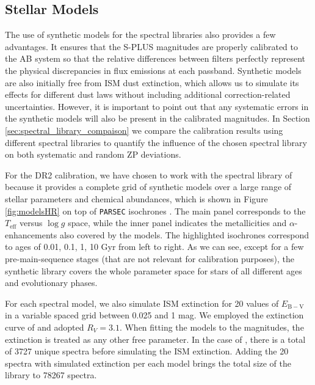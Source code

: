 \documentclass[fleqn,usenatbib]{mnras}
\begin{document}
\subsection{Stellar Models}
\label{sec:models}

The use of synthetic models for the spectral libraries also provides a few advantages. It ensures that the S-PLUS magnitudes are properly calibrated to the AB system so that the relative differences between filters perfectly represent the physical discrepancies in flux emissions at each passband. Synthetic models are also initially free from ISM dust extinction, which allows us to simulate its effects for different dust laws without including additional correction-related uncertainties. However, it is important to point out that any systematic errors in the synthetic models will also be present in the calibrated magnitudes. In Section \ref{sec:spectral_library_compaison} we compare the calibration results using different spectral libraries to quantify the influence of the chosen spectral library on both systematic and random ZP deviations.

For the DR2 calibration, we have chosen to work with the spectral library of  because it provides a complete grid of synthetic models over a large range of stellar parameters and chemical abundances, which is shown in Figure \ref{fig:modelsHR} on top of \texttt{PARSEC} isochrones \citep{Bressan+2012, Marigo+2017}. The main panel corresponds to the $T_\mathrm{eff}$ versus $\log g$ space, while the inner panel indicates the metallicities and $\alpha$-enhancements also covered by the models. The highlighted isochrones correspond to ages of 0.01, 0.1, 1, 10 Gyr from left to right. As we can see, except for a few pre-main-sequence stages (that are not relevant for calibration purposes), the synthetic library covers the whole parameter space for stars of all different ages and evolutionary phases. 

For each spectral model, we also simulate ISM extinction for 20 values of $E_\mathrm{B-V}$ in a variable spaced grid between 0.025 and 1 mag. We employed the extinction curve of \citet{Cardelli+1989} and adopted $R_V = 3.1$. When fitting the models to the magnitudes, the extinction is treated as any other free parameter. In the case of , there is a total of 3727 unique spectra before simulating the ISM extinction. Adding the 20 spectra with simulated extinction per each model brings the total size of the library to 78267 spectra.
\end{document}
